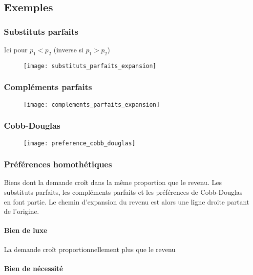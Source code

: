 \subsection{Exemples}

\subsubsection{Substituts parfaits}

Ici pour $p_1 < p_2$ (inverse si $p_1 > p_2$)
\begin{figure}[H]
	\centering
	\texttt{[image: substituts\_parfaits\_expansion]}
\end{figure}

\subsubsection{Compléments parfaits}

\begin{figure}[H]
	\centering
	\texttt{[image: complements\_parfaits\_expansion]}
\end{figure}

\subsubsection{Cobb-Douglas}

\begin{figure}[H]
	\centering
	\texttt{[image: preference\_cobb\_douglas]}
\end{figure}

\subsubsection{Préférences homothétiques}

Biens dont la demande croît dans la même proportion que le revenu. Les substituts parfaits, les compléments parfaits et les préférences de Cobb-Douglas en font partie. Le chemin d'expansion du revenu est alors une ligne droite partant de l'origine.

\paragraph{Bien de luxe}

La demande croît proportionnellement plus que le revenu

\paragraph{Bien de nécessité}

